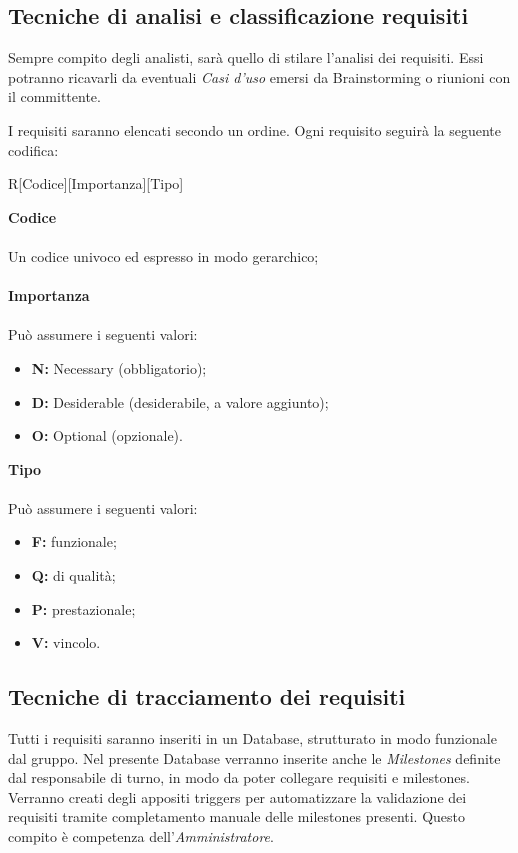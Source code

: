 \documentclass[a4paper]{report}
\begin{document}
			\subsection{Tecniche di analisi e classificazione requisiti}
				Sempre compito degli analisti, sarà quello di stilare l'analisi dei requisiti. Essi potranno ricavarli da eventuali \emph{Casi 
				d'uso} emersi da Brainstorming o riunioni con il committente.
				
				I requisiti saranno elencati secondo un ordine. Ogni requisito seguirà la seguente codifica: \\
				\begin{center}
					R[Codice][Importanza][Tipo]
				\end{center}
					\textbf{Codice} \\ \\ Un codice univoco ed espresso in modo gerarchico;\\ \\
					\textbf{Importanza} \\ \\Può assumere i seguenti valori:
					\begin{itemize}
						\item \textbf{N:} Necessary (obbligatorio);
						\item \textbf{D:} Desiderable (desiderabile, a valore aggiunto);
						\item \textbf{O:} Optional (opzionale).
					\end{itemize}
					\textbf{Tipo} \\ \\Può assumere i seguenti valori:
					\begin{itemize}
						\item \textbf{F:} funzionale;
						\item \textbf{Q:} di qualità;
						\item \textbf{P:} prestazionale;
						\item \textbf{V:} vincolo.
					\end{itemize}
			\subsection{Tecniche di tracciamento dei requisiti}
				Tutti i requisiti saranno inseriti in un Database, strutturato in modo funzionale dal gruppo. Nel presente Database verranno
				inserite anche le \emph{Milestones} definite dal responsabile di turno, in modo da poter collegare requisiti e milestones. 
				Verranno creati degli appositi triggers per automatizzare la validazione dei requisiti tramite completamento manuale delle
				milestones presenti. Questo compito è competenza dell'\emph{Amministratore}.
\end{document}
